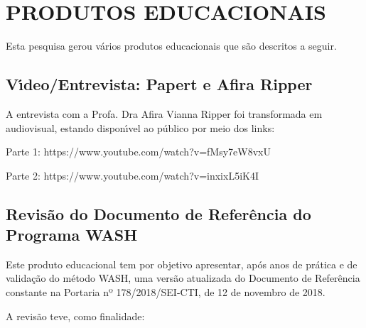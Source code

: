 \documentclass[
12pt,		%
openright,	%
twoside,  %
a4paper,			%
chapter=TITLE,		%
english,			%
french,				%
spanish,			%
brazil				%
]{USPSC-classe/USPSC}
\begin{document}
\chapter[PRODUTOS EDUCACIONAIS]{PRODUTOS EDUCACIONAIS}\label{PRODUTOS EDUCACIONAIS}
Esta pesquisa gerou v\'arios produtos educacionais que s\~ao descritos a seguir.








\section[V\'{\i}deo/Entrevista: Papert e Afira Ripper]{V\'{\i}deo/Entrevista: Papert e Afira Ripper}\label{V\'{\i}deo/Entrevista: Papert e Afira Ripper}
A entrevista com a Profa. Dra Afira Vianna Ripper foi transformada em audiovisual, estando dispon\'{\i}vel ao p\'ublico por meio dos links:









\begin{alineas}
\item Parte 1: https://www.youtube.com/watch?v=fMsy7eW8vxU
\item Parte 2: https://www.youtube.com/watch?v=inxixL5iK4I
\end{alineas}

\section[Revis\~ao do Documento de Refer\^encia do Programa WASH]{Revis\~ao do Documento de Refer\^encia do Programa WASH}\label{Revis\~ao do Documento de Refer\^encia do Programa WASH}
Este produto educacional tem por objetivo apresentar, ap\'os anos de pr\'atica e de valida\c{c}\~ao do m\'etodo WASH, uma vers\~ao atualizada do Documento de Refer\^encia constante na Portaria nº 178/2018/SEI-CTI, de 12 de novembro de 2018.








A revis\~ao teve, como finalidade:
\end{document}

